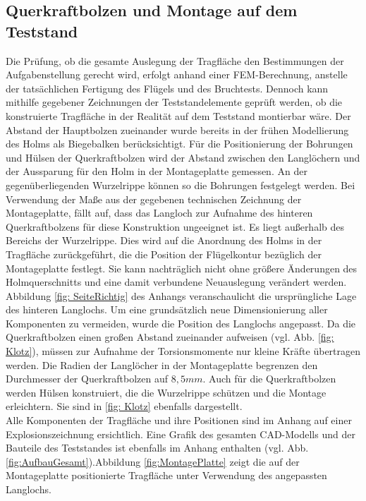 \subsection{Querkraftbolzen und Montage auf dem Teststand}
Die Prüfung, ob die gesamte Auslegung der Tragfläche den Bestimmungen der Aufgabenstellung gerecht wird, erfolgt anhand einer FEM-Berechnung, anstelle der tatsächlichen Fertigung des Flügels und des Bruchtests. Dennoch kann mithilfe gegebener Zeichnungen der Teststandelemente geprüft werden, ob die konstruierte Tragfläche in der Realität auf dem Teststand montierbar wäre. Der Abstand der Hauptbolzen zueinander wurde bereits in der frühen Modellierung des Holms als Biegebalken berücksichtigt. Für die Positionierung der Bohrungen und Hülsen der Querkraftbolzen wird der Abstand zwischen den Langlöchern und der Aussparung für den Holm in der Montageplatte gemessen. An der gegenüberliegenden Wurzelrippe können so die Bohrungen festgelegt werden. Bei Verwendung der Maße aus der gegebenen technischen Zeichnung der Montageplatte, fällt auf, dass das Langloch zur Aufnahme des hinteren Querkraftbolzens für diese Konstruktion ungeeignet ist. Es liegt außerhalb des Bereichs der Wurzelrippe. Dies wird auf die Anordnung des Holms in der Tragfläche zurückgeführt, die die Position der Flügelkontur bezüglich der Montageplatte festlegt. Sie kann nachträglich nicht ohne größere Änderungen des Holmquerschnitts und eine damit verbundene Neuauslegung verändert werden. Abbildung \ref{fig: SeiteRichtig} des Anhangs veranschaulicht die ursprüngliche Lage des hinteren Langlochs. Um eine grundsätzlich neue Dimensionierung aller Komponenten zu vermeiden, wurde die Position des Langlochs angepasst. Da die Querkraftbolzen einen großen Abstand zueinander aufweisen (vgl. Abb. \ref{fig: Klotz}), müssen zur Aufnahme der Torsionsmomente nur kleine Kräfte übertragen werden. Die Radien der Langlöcher in der Montageplatte begrenzen den Durchmesser der Querkraftbolzen auf $ 8,5mm $. Auch für die Querkraftbolzen werden Hülsen konstruiert, die die Wurzelrippe schützen und die Montage erleichtern. Sie sind in \ref{fig: Klotz} ebenfalls dargestellt.\\

\noindent Alle Komponenten der Tragfläche und ihre Positionen sind im Anhang auf einer Explosionszeichnung ersichtlich. Eine Grafik des gesamten CAD-Modells und der Bauteile des Teststandes ist ebenfalls im Anhang enthalten (vgl. Abb. \ref{fig:AufbauGesamt}).Abbildung \ref{fig:MontagePlatte} zeigt die auf der Montageplatte positionierte Tragfläche unter Verwendung des angepassten Langlochs.
